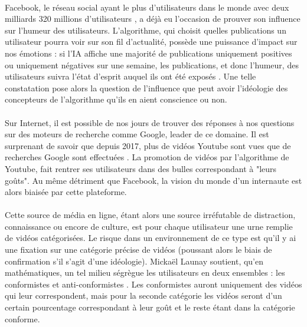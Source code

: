 \documentclass[10pt, french, a4paper]{report}
\begin{document}
\paragraph{}
Facebook, le réseau social ayant le plus d’utilisateurs dans le monde avec deux milliards 320 millions d’utilisateurs \citep{clement_global_2019}, a déjà eu l’occasion de prouver son influence sur l’humeur des utilisateurs. L’algorithme, qui choisit quelles publications un utilisateur pourra voir sur son fil d’actualité, possède une puissance d’impact sur nos émotions : si l’IA affiche une majorité de publications uniquement positives ou uniquement négatives sur une semaine, les publications, et donc l’humeur, des utilisateurs suivra l’état d’esprit auquel ils ont été exposés \citep{kramer_correction_2014}. Une telle constatation pose alors la question de l’influence que peut avoir l’idéologie des concepteurs de l’algorithme qu’ils en aient conscience ou non.

\paragraph{}
Sur Internet, il est possible de nos jours de trouver des réponses à nos questions sur des moteurs de recherche comme Google, leader de ce domaine. Il est surprenant de savoir que depuis 2017, plus de vidéos Youtube sont vues que de recherches Google sont effectuées \citep{desjardins_infographic:_2018}. La promotion de vidéos par l’algorithme de Youtube, fait rentrer ses utilisateurs dans des bulles correspondant à "leurs goûts". Au même détriment que Facebook, la vision du monde d’un internaute est alors biaisée par cette plateforme.

\paragraph{}
Cette source de média en ligne, étant alors une source irréfutable de distraction, connaissance ou encore de culture, est pour chaque utilisateur une urne remplie de vidéos catégorisées. Le risque dans un environnement de ce type est qu’il y ai une fixation sur une catégorie précise de vidéos (poussant alors le biais de confirmation s’il s’agit d’une idéologie). Mickaël Launay soutient, qu’en mathématiques, un tel milieu ségrègue les utilisateurs en deux ensembles : les conformistes et anti-conformistes \citep{launay_urnes_2012}. Les conformistes auront uniquement des vidéos qui leur correspondent, mais pour la seconde catégorie les vidéos seront d’un certain pourcentage correspondant à leur goût et le reste étant dans la catégorie conforme.
\end{document}
